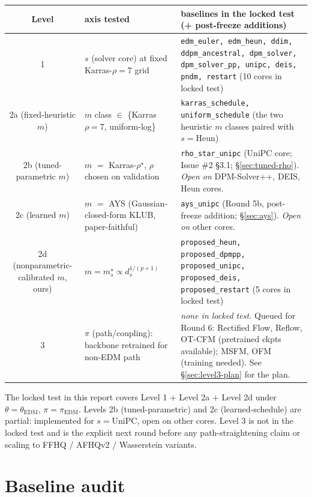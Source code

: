 \documentclass[11pt]{article}
\begin{document}
\begin{center}
\scriptsize
\begin{tabular}{c p{4.0cm} p{8.5cm}}
\toprule
Level & axis tested & baselines in the locked test (+ post-freeze additions) \\
\midrule
1 & \(s\) (solver core) at fixed Karras-\(\rho{=}7\) grid
  & \texttt{edm\_euler, edm\_heun, ddim, ddpm\_ancestral, dpm\_solver, dpm\_solver\_pp, unipc, deis, pndm, restart} (10 cores in locked test) \\
2a (fixed-heuristic \(m\))
  & \(m\) class \(\in\) \{Karras \(\rho{=}7\), uniform-log\}
  & \texttt{karras\_schedule, uniform\_schedule} (the two heuristic \(m\) classes paired with \(s{=}\mathrm{Heun}\)) \\
2b (tuned-parametric \(m\))
  & \(m\) \(=\) Karras-\(\rho^\star\), \(\rho\) chosen on validation
  & \texttt{rho\_star\_unipc} (UniPC core; Issue \#2 \S3.1; \S\ref{sec:tuned-rho}). \emph{Open on} DPM-Solver++, DEIS, Heun cores. \\
2c (learned \(m\))
  & \(m\) \(=\) AYS (Gaussian-closed-form KLUB, paper-faithful)
  & \texttt{ays\_unipc} (Round 5b, post-freeze addition; \S\ref{sec:ays}). \emph{Open on} other cores. \\
2d (nonparametric-calibrated \(m\), ours)
  & \(m = m^\star_s \propto d_s^{1/(p+1)}\)
  & \texttt{proposed\_heun, proposed\_dpmpp, proposed\_unipc, proposed\_deis, proposed\_restart} (5 cores in locked test) \\
3 & \(\pi\) (path/coupling): backbone retrained for non-EDM path
  & \emph{none in locked test.} Queued for Round 6: Rectified Flow, Reflow, OT-CFM (pretrained ckpts available); MSFM, OFM (training needed). See \S\ref{sec:level3-plan} for the plan. \\
\bottomrule
\end{tabular}
\end{center}

\noindent
The locked test in this report covers Level 1 + Level 2a + Level 2d
under \(\theta = \theta_{\mathrm{EDM}}\), \(\pi = \pi_{\mathrm{EDM}}\).
Levels 2b (tuned-parametric) and 2c (learned-schedule) are partial:
implemented for \(s{=}\mathrm{UniPC}\), open on other cores. Level 3 is
not in the locked test and is the explicit next round before any
path-straightening claim or scaling to FFHQ / AFHQv2 / Wasserstein
variants.

\section{Baseline audit}
\end{document}
